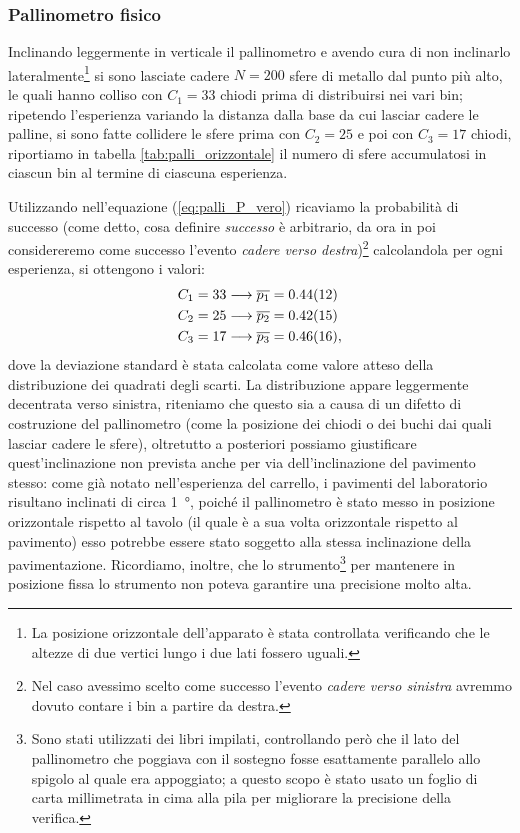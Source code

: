 \documentclass[10pt,oneside,a4paper]{article}
\begin{document}
\subsubsection{Pallinometro fisico}
Inclinando leggermente in verticale il pallinometro e avendo cura di non inclinarlo lateralmente\footnote{La posizione orizzontale dell'apparato è stata controllata verificando che le altezze di due vertici lungo i due lati fossero uguali.} si sono lasciate cadere $N = 200$ sfere di metallo dal punto più alto, le quali hanno colliso con $C_1 = 33$ chiodi prima di distribuirsi nei vari bin; ripetendo l'esperienza variando la distanza dalla base da cui lasciar cadere le palline, si sono fatte collidere le sfere prima con $C_2 = 25$ e poi con $C_3 = 17$ chiodi, riportiamo in tabella \ref{tab:palli_orizzontale} il numero di sfere accumulatosi in ciascun bin al termine di ciascuna esperienza.

Utilizzando nell'equazione (\ref{eq:palli_P_vero}) ricaviamo la probabilità di successo (come detto, cosa definire \emph{successo} è arbitrario, da ora in poi considereremo come successo l'evento \emph{cadere verso destra})\footnote{Nel caso avessimo scelto come successo l'evento \emph{cadere verso sinistra} avremmo dovuto contare i bin a partire da destra.} calcolandola per ogni esperienza, si ottengono i valori:
\begin{align*}
	C_1 = 33 &\longrightarrow \overline{p_1} = \SI{0.44 \pm 0.12}{} \\ 
	C_2 = 25 &\longrightarrow \overline{p_2} = \SI{0.42 \pm 0.15}{} \\
	C_3 = 17 &\longrightarrow \overline{p_3} = \SI{0.46 \pm 0.16}{},
\end{align*}
dove la deviazione standard è stata calcolata come valore atteso della distribuzione dei quadrati degli scarti. La distribuzione appare leggermente decentrata verso sinistra, riteniamo che questo sia a causa di un difetto di costruzione del pallinometro (come la posizione dei chiodi o dei buchi dai quali lasciar cadere le sfere), oltretutto a posteriori possiamo giustificare quest'inclinazione non prevista anche per via dell'inclinazione del pavimento stesso: come già notato nell'esperienza del carrello, i pavimenti del laboratorio risultano inclinati di circa \SI{1}{°}, poiché il pallinometro è stato messo in posizione orizzontale rispetto al tavolo (il quale è a sua volta orizzontale rispetto al pavimento) esso potrebbe essere stato soggetto alla stessa inclinazione della pavimentazione. Ricordiamo, inoltre, che lo strumento\footnote{Sono stati utilizzati dei libri impilati, controllando però che il lato del pallinometro che poggiava con il sostegno fosse esattamente parallelo allo spigolo al quale era appoggiato; a questo scopo è stato usato un foglio di carta millimetrata in cima alla pila per migliorare la precisione della verifica.} per mantenere in posizione fissa lo strumento non poteva garantire una precisione molto alta.
\end{document}
